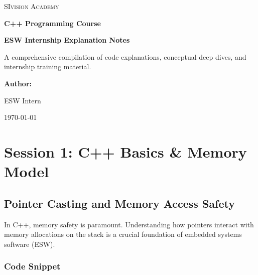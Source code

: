 \documentclass[11pt,a4paper]{article}
\begin{document}
\begin{titlepage}
    \centering
    \vspace*{2cm}
    
    {\scshape\Large SIvision Academy \par}
    \vspace{1.5cm}
    
    {\Huge\bfseries C++ Programming Course \par}
    \vspace{0.5cm}
    {\large\bfseries ESW Internship Explanation Notes \par}
    \vspace{2cm}
    
    \begin{tcolorbox}[colback=primary!5!white,colframe=primary,arc=8pt,halign=center]
        \centering\medskip
        A comprehensive compilation of code explanations, conceptual deep dives, and internship training material.
        \medskip
    \end{tcolorbox}
    
    \vfill
    
    {\large\bfseries Author:}\par
    {\large ESW Intern \par}
    
    \vspace{1.5cm}
    {\large\today \par}
\end{titlepage}

\newpage
\tableofcontents
\newpage

\section{Session 1: C++ Basics \& Memory Model}

\subsection{Pointer Casting and Memory Access Safety}

In C++, memory safety is paramount. Understanding how pointers interact with memory allocations on the stack is a crucial foundation of embedded systems software (ESW).

\subsubsection{Code Snippet}
\end{document}
